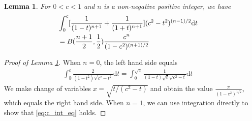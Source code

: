 \documentclass[conference,a4paper]{IEEEtran}
\def\d{\mathrm{d}}
\newtheorem{lemma}{Lemma}
\begin{document}
\begin{lemma}\label{lem:cn_integration}
For $0<c<1$ and $n$ is a non-negative positive integer, we have
\begin{align}
    &\int_0^{c}
    [\frac{1}{(1-t)^{n+1}}+\frac{1}{(1+t)^{n+1}}]
    (c^2- t^2)^{(n-1)/2}\d t\notag\\
    &=B(\frac{n+1}{2}, \frac{1}{2})
    \frac{c^n}{(1-c^2)^{(n+1)/2}}\label{eq:c_int_eq}
    \end{align}
\end{lemma}
\begin{proof}[Proof of Lemma \ref{lem:cn_integration}]
     When $n=0$, the left hand side equals
     \begin{align*}
          \int_0^c \frac{2}{(1-t^2)\sqrt{c^2-t^2}} \d t
          = \int_0^{\sqrt{c}} \frac{1}{(1-t) \sqrt{t} \sqrt{c^2-t} }\d t
     \end{align*}     
     We make change of variables $x=\sqrt{t/(c^2-t)}$ and obtain
     the value $\frac{\pi}{(1-c^2)^{1/2}}$, which equals
     the right hand side.
     When $n=1$, we can use integration directly
     to show that \eqref{eq:c_int_eq} holds.


\end{proof}
\end{document}
